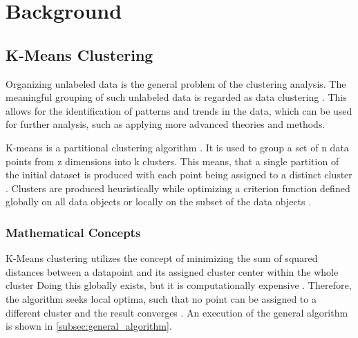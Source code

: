 \section{Background}
\label{cha:background}







\subsection{K-Means Clustering}
\label{sec:k_means_clustering}
Organizing unlabeled data \cite{EZU-CPF} is the general problem of the clustering analysis.
The meaningful grouping of such unlabeled data is regarded as data clustering \cite{ABI-RKC}.
This allows for the identification of patterns and trends in the data, which can be used for further analysis, such as applying more advanced theories and methods.

K-means is a partitional clustering algorithm \cite{SIN-UKC}.
It is used to group a set of n data points from z dimensions into k clusters.
This means, that a single partition of the initial dataset is produced with each point being assigned to a distinct cluster \cite{SIN-UKC}.
Clusters are produced heuristically while optimizing a criterion function defined globally on all data objects or locally on the subset of the data objects \cite{ZHU-EPC}.

\subsubsection{Mathematical Concepts}
K-Means clustering utilizes the concept of minimizing the sum of squared distances between a datapoint and its assigned cluster center within the whole cluster \cite{HAR-KMA}
Doing this globally exists, but it is computationally expensive \cite{LIS-GKC}.
Therefore, the algorithm seeks local optima, such that no point can be assigned to a different cluster and the result converges \cite{SEL-GCT}.
An execution of the general algorithm is shown in \ref{subsec:general_algorithm}.

